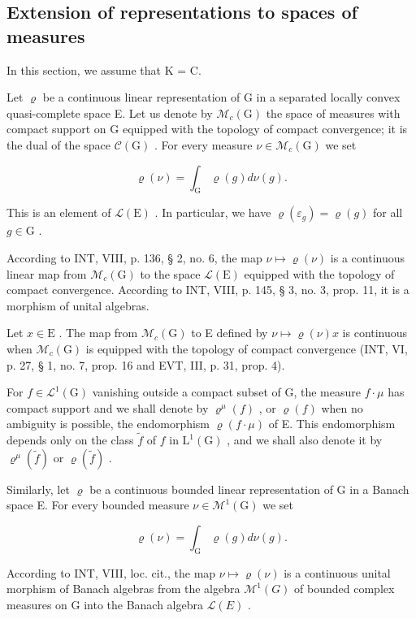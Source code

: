 \subsection{Extension of representations to spaces of measures}

In this section, we assume that K = C.

Let \(\varrho\) be a continuous linear representation of G in a separated locally convex quasi-complete space E. Let us denote by \(\mathcal{M}_{c}(\mathrm{G})\) the space of measures with compact support on G equipped with the topology of compact convergence; it is the dual of the space \(\mathcal{C}(\mathrm{G})\) . For every measure \(\nu \in \mathcal{M}_{c}(\mathrm{G})\) we set

\[
\varrho (\nu) = \int_ {\mathrm{G}} \varrho (g) d \nu (g).
\]

This is an element of \(\mathcal{L}(\mathrm{E})\) . In particular, we have \(\varrho(\varepsilon_g) = \varrho(g)\) for all \(g \in \mathrm{G}\) .

According to INT, VIII, p. 136, § 2, no. 6, the map \(\nu \mapsto \varrho(\nu)\) is a continuous linear map from \(\mathcal{M}_c(\mathrm{G})\) to the space \(\mathcal{L}(\mathrm{E})\) equipped with the topology of compact convergence. According to INT, VIII, p. 145, § 3, no. 3, prop. 11, it is a morphism of unital algebras.

Let \(x \in \mathrm{E}\) . The map from \(\mathcal{M}_c(\mathrm{G})\) to E defined by \(\nu \mapsto \varrho(\nu)x\) is continuous when \(\mathcal{M}_c(\mathrm{G})\) is equipped with the topology of compact convergence (INT, VI, p. 27, § 1, no. 7, prop. 16 and EVT, III, p. 31, prop. 4).

For \(f \in \mathcal{L}^{1}(\mathrm{G})\) vanishing outside a compact subset of G, the measure \(f \cdot \mu\) has compact support and we shall denote by \(\varrho^{\mu}(f)\) , or \(\varrho(f)\) when no ambiguity is possible, the endomorphism \(\varrho(f \cdot \mu)\) of E. This endomorphism depends only on the class \(\widetilde{f}\) of \(f\) in \(\mathrm{L}^{1}(\mathrm{G})\) , and we shall also denote it by \(\varrho^{\mu}(\widetilde{f})\) or \(\varrho(\widetilde{f})\) .

Similarly, let \(\varrho\) be a continuous bounded linear representation of G in a Banach space E. For every bounded measure \(\nu \in \mathcal{M}^{1}(\mathrm{G})\) we set

\[
\varrho (\nu) = \int_ {\mathrm{G}} \varrho (g) d \nu (g).
\]

According to INT, VIII, loc. cit., the map \(\nu \mapsto \varrho(\nu)\) is a continuous unital morphism of Banach algebras from the algebra \(\mathcal{M}^{1}(G)\) of bounded complex measures on G into the Banach algebra \(\mathcal{L}(E)\) .

